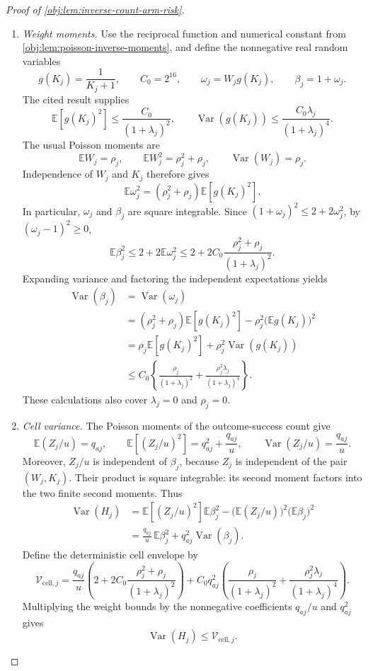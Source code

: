 \begin{proof}[Proof of \cref{obj:lem:inverse-count-arm-risk}]
\begin{enumerate}
\item \emph{Weight moments.}
Use the reciprocal function and numerical constant from
\cref{obj:lem:poisson-inverse-moments}, and define the nonnegative real
random variables
\[
g(K_j)=\frac1{K_j+1},\qquad
C_0=2^{16},\qquad
\omega_j=W_jg(K_j),\qquad
\beta_j=1+\omega_j.
\]
The cited result supplies
\[
\mathbb E[g(K_j)^2]\le\frac{C_0}{(1+\lambda_j)^2},
\qquad
\operatorname{Var}(g(K_j))
\le\frac{C_0\lambda_j}{(1+\lambda_j)^4}.
\]
The usual Poisson moments are
\[
\mathbb E W_j=\rho_j,\qquad
\mathbb E W_j^2=\rho_j^2+\rho_j,\qquad
\operatorname{Var}(W_j)=\rho_j.
\]
Independence of \(W_j\) and \(K_j\) therefore gives
\[
\mathbb E\omega_j^2
=(\rho_j^2+\rho_j)\mathbb E[g(K_j)^2].
\]
In particular, \(\omega_j\) and \(\beta_j\) are square integrable. Since
\((1+\omega_j)^2\le2+2\omega_j^2\), by
\((\omega_j-1)^2\ge0\),
\[
\mathbb E\beta_j^2
\le2+2\mathbb E\omega_j^2
\le2+2C_0\frac{\rho_j^2+\rho_j}{(1+\lambda_j)^2}.
\]
Expanding variance and factoring the independent expectations yields
\[
\begin{aligned}
\operatorname{Var}(\beta_j)
&=\operatorname{Var}(\omega_j)\\
&=(\rho_j^2+\rho_j)\mathbb E[g(K_j)^2]
-\rho_j^2\bigl(\mathbb E g(K_j)\bigr)^2\\
&=\rho_j\mathbb E[g(K_j)^2]
+\rho_j^2\operatorname{Var}(g(K_j))\\
&\le C_0\left\{
\frac{\rho_j}{(1+\lambda_j)^2}
+\frac{\rho_j^2\lambda_j}{(1+\lambda_j)^4}
\right\}.
\end{aligned}
\]
These calculations also cover \(\lambda_j=0\) and \(\rho_j=0\).

\item \emph{Cell variance.}
The Poisson moments of the outcome-success count give
\[
\mathbb E(Z_j/u)=q_{aj},\qquad
\mathbb E[(Z_j/u)^2]=q_{aj}^2+\frac{q_{aj}}u,
\qquad
\operatorname{Var}(Z_j/u)=\frac{q_{aj}}u.
\]
Moreover, \(Z_j/u\) is independent of \(\beta_j\), because \(Z_j\) is
independent of the pair \((W_j,K_j)\). Their product is square integrable:
its second moment factors into the two finite second moments. Thus
\[
\begin{aligned}
\operatorname{Var}(H_j)
&=\mathbb E[(Z_j/u)^2]\mathbb E\beta_j^2
-\bigl(\mathbb E(Z_j/u)\bigr)^2
 \bigl(\mathbb E\beta_j\bigr)^2\\
&=\frac{q_{aj}}u\,\mathbb E\beta_j^2
+q_{aj}^2\operatorname{Var}(\beta_j).
\end{aligned}
\]
Define the deterministic cell envelope by
\[
\mathcal V_{\mathrm{cell},j}
=
\frac{q_{aj}}u\left(
2+2C_0\frac{\rho_j^2+\rho_j}{(1+\lambda_j)^2}
\right)
+C_0q_{aj}^2\left(
\frac{\rho_j}{(1+\lambda_j)^2}
+\frac{\rho_j^2\lambda_j}{(1+\lambda_j)^4}
\right).
\]
Multiplying the weight bounds by the nonnegative coefficients
\(q_{aj}/u\) and \(q_{aj}^2\) gives
\[
\operatorname{Var}(H_j)\le\mathcal V_{\mathrm{cell},j}.
\]


\end{enumerate}
\end{proof}
